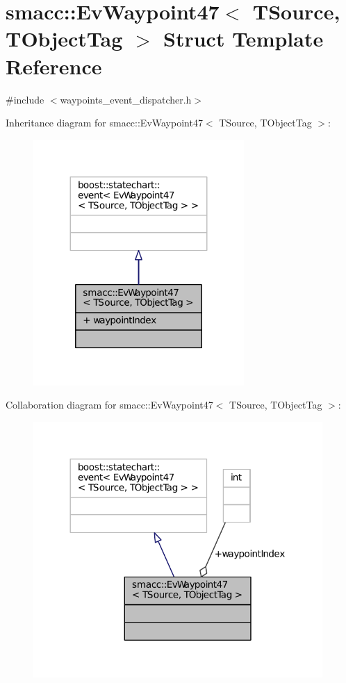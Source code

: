 \hypertarget{structsmacc_1_1EvWaypoint47}{}\section{smacc\+:\+:Ev\+Waypoint47$<$ T\+Source, T\+Object\+Tag $>$ Struct Template Reference}
\label{structsmacc_1_1EvWaypoint47}


{\ttfamily \#include $<$waypoints\+\_\+event\+\_\+dispatcher.\+h$>$}



Inheritance diagram for smacc\+:\+:Ev\+Waypoint47$<$ T\+Source, T\+Object\+Tag $>$\+:
\nopagebreak
\begin{figure}[H]
\begin{center}
\leavevmode
\includegraphics[width=227pt]{structsmacc_1_1EvWaypoint47__inherit__graph}
\end{center}
\end{figure}


Collaboration diagram for smacc\+:\+:Ev\+Waypoint47$<$ T\+Source, T\+Object\+Tag $>$\+:
\nopagebreak
\begin{figure}[H]
\begin{center}
\leavevmode
\includegraphics[width=312pt]{structsmacc_1_1EvWaypoint47__coll__graph}
\end{center}
\end{figure}
